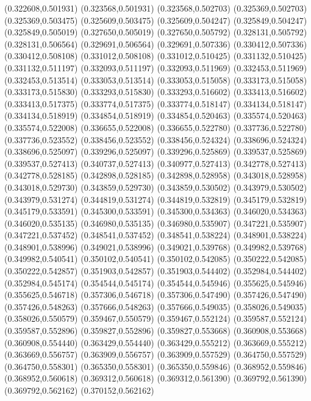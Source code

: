 (0.322608,0.501931)
(0.323568,0.501931)
(0.323568,0.502703)
(0.325369,0.502703)
(0.325369,0.503475)
(0.325609,0.503475)
(0.325609,0.504247)
(0.325849,0.504247)
(0.325849,0.505019)
(0.327650,0.505019)
(0.327650,0.505792)
(0.328131,0.505792)
(0.328131,0.506564)
(0.329691,0.506564)
(0.329691,0.507336)
(0.330412,0.507336)
(0.330412,0.508108)
(0.331012,0.508108)
(0.331012,0.510425)
(0.331132,0.510425)
(0.331132,0.511197)
(0.332093,0.511197)
(0.332093,0.511969)
(0.332453,0.511969)
(0.332453,0.513514)
(0.333053,0.513514)
(0.333053,0.515058)
(0.333173,0.515058)
(0.333173,0.515830)
(0.333293,0.515830)
(0.333293,0.516602)
(0.333413,0.516602)
(0.333413,0.517375)
(0.333774,0.517375)
(0.333774,0.518147)
(0.334134,0.518147)
(0.334134,0.518919)
(0.334854,0.518919)
(0.334854,0.520463)
(0.335574,0.520463)
(0.335574,0.522008)
(0.336655,0.522008)
(0.336655,0.522780)
(0.337736,0.522780)
(0.337736,0.523552)
(0.338456,0.523552)
(0.338456,0.524324)
(0.338696,0.524324)
(0.338696,0.525097)
(0.339296,0.525097)
(0.339296,0.525869)
(0.339537,0.525869)
(0.339537,0.527413)
(0.340737,0.527413)
(0.340977,0.527413)
(0.342778,0.527413)
(0.342778,0.528185)
(0.342898,0.528185)
(0.342898,0.528958)
(0.343018,0.528958)
(0.343018,0.529730)
(0.343859,0.529730)
(0.343859,0.530502)
(0.343979,0.530502)
(0.343979,0.531274)
(0.344819,0.531274)
(0.344819,0.532819)
(0.345179,0.532819)
(0.345179,0.533591)
(0.345300,0.533591)
(0.345300,0.534363)
(0.346020,0.534363)
(0.346020,0.535135)
(0.346980,0.535135)
(0.346980,0.535907)
(0.347221,0.535907)
(0.347221,0.537452)
(0.348541,0.537452)
(0.348541,0.538224)
(0.348901,0.538224)
(0.348901,0.538996)
(0.349021,0.538996)
(0.349021,0.539768)
(0.349982,0.539768)
(0.349982,0.540541)
(0.350102,0.540541)
(0.350102,0.542085)
(0.350222,0.542085)
(0.350222,0.542857)
(0.351903,0.542857)
(0.351903,0.544402)
(0.352984,0.544402)
(0.352984,0.545174)
(0.354544,0.545174)
(0.354544,0.545946)
(0.355625,0.545946)
(0.355625,0.546718)
(0.357306,0.546718)
(0.357306,0.547490)
(0.357426,0.547490)
(0.357426,0.548263)
(0.357666,0.548263)
(0.357666,0.549035)
(0.358026,0.549035)
(0.358026,0.550579)
(0.359467,0.550579)
(0.359467,0.552124)
(0.359587,0.552124)
(0.359587,0.552896)
(0.359827,0.552896)
(0.359827,0.553668)
(0.360908,0.553668)
(0.360908,0.554440)
(0.363429,0.554440)
(0.363429,0.555212)
(0.363669,0.555212)
(0.363669,0.556757)
(0.363909,0.556757)
(0.363909,0.557529)
(0.364750,0.557529)
(0.364750,0.558301)
(0.365350,0.558301)
(0.365350,0.559846)
(0.368952,0.559846)
(0.368952,0.560618)
(0.369312,0.560618)
(0.369312,0.561390)
(0.369792,0.561390)
(0.369792,0.562162)
(0.370152,0.562162)
